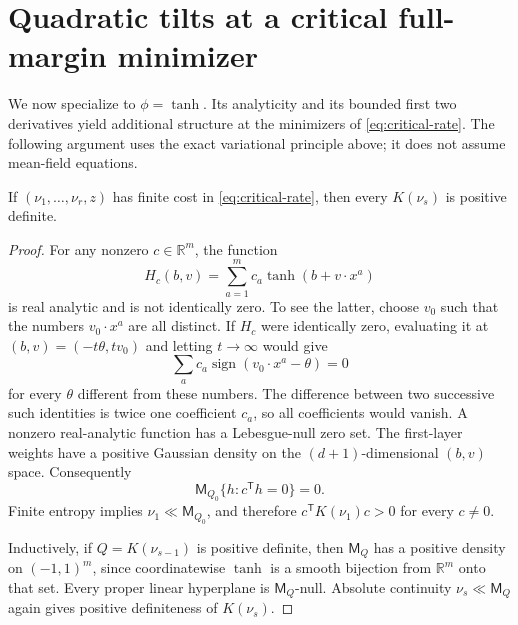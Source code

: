 \section{Quadratic tilts at a critical full-margin minimizer}
\label{sec:critical-stationarity}

We now specialize to $\phi=\tanh$. Its analyticity and its bounded first two
derivatives yield additional structure at the minimizers of
\eqref{eq:critical-rate}. The following argument uses the exact variational
principle above; it does not assume mean-field equations.

\begin{lemma}
\label{lem:critical-positive-definite}
If $(\nu_1,\ldots,\nu_r,z)$ has finite cost in
\eqref{eq:critical-rate}, then every $K(\nu_s)$ is positive definite.
\end{lemma}
\begin{proof}
For any nonzero $c\in\mathbb R^m$, the function
\[
 H_c(b,v)=\sum_{a=1}^m c_a\tanh(b+v\cdot x^a)
\]
is real analytic and is not identically zero. To see the latter, choose
$v_0$ such that the numbers $v_0\cdot x^a$ are all distinct. If $H_c$ were
identically zero, evaluating it at $(b,v)=(-t\theta,tv_0)$ and letting
$t\to\infty$ would give
\[
 \sum_a c_a\operatorname{sign}(v_0\cdot x^a-\theta)=0
\]
for every $\theta$ different from these numbers. The difference between
two successive such identities is twice one coefficient $c_a$, so all
coefficients would vanish. A nonzero real-analytic function has a
Lebesgue-null zero set. The first-layer weights have a positive Gaussian
density on the $(d+1)$-dimensional $(b,v)$ space. Consequently
\[
 \mathsf M_{Q_0}\{h:c^{\mathsf T}h=0\}=0.
\]
Finite entropy implies $\nu_1\ll\mathsf M_{Q_0}$, and therefore
$c^{\mathsf T}K(\nu_1)c>0$ for every $c\ne0$.

Inductively, if $Q=K(\nu_{s-1})$ is positive definite, then
$\mathsf M_Q$ has a positive density on $(-1,1)^m$, since coordinatewise
$\tanh$ is a smooth bijection from $\mathbb R^m$ onto that set.
Every proper linear hyperplane is $\mathsf M_Q$-null. Absolute continuity
$\nu_s\ll\mathsf M_Q$ again gives positive definiteness of $K(\nu_s)$.
\end{proof}

